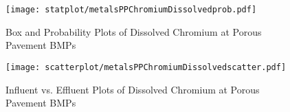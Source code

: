         \begin{figure}[hb]   %
            \centering
            \texttt{[image: statplot/metalsPPChromiumDissolvedprob.pdf]}
            \caption{Box and Probability Plots of Dissolved Chromium at Porous Pavement BMPs}
        \end{figure}         %
        
        
        \begin{figure}[hb]   %
            \centering
            \texttt{[image: scatterplot/metalsPPChromiumDissolvedscatter.pdf]}
            \caption{Influent vs. Effluent Plots of Dissolved Chromium at Porous Pavement BMPs}
        \end{figure}         %
        \clearpage
        